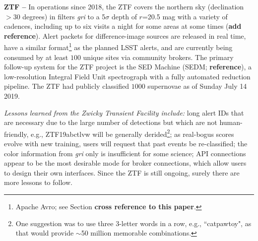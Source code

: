 {\bf ZTF --} In operations since 2018, the ZTF covers the northern sky (declination $>$30 degrees) in filters {\it gri} to a 5$\sigma$ depth of $r$=20.5 mag with a variety of cadences, including up to six visits a night for some areas at some times ({\bf add reference}). Alert packets for difference-image sources are released in real time, have a similar format\footnote{Apache Avro; see Section {\bf cross reference to this paper}.} as the planned LSST alerts, and are currently being consumed by at least $100$ unique sites via community brokers. The primary follow-up system for the ZTF project is the SED Machine (SEDM; {\bf reference}), a low-resolution Integral Field Unit spectrograph with a fully automated reduction pipeline. The ZTF had publicly classified $1000$ supernovae as of Sunday July 14 2019. 

{\it Lessons learned from the Zwicky Transient Facility include:} long alert IDs that are necessary due to the large number of detections but which are not human-friendly, e.g., ZTF19abctlvw will be generally derided\footnote{One suggestion was to use three 3-letter words in a row, e.g., ``catpawtoy", as that would provide $\sim$50 million memorable combinations.}; as real-bogus scores evolve with new training, users will request that past events be re-classified; the color information from {\it gri} only is insufficient for some science; API connections appear to be the most desirable mode for broker connections, which allow users to design their own interfaces. Since the ZTF is still ongoing, surely there are more lessons to follow.


